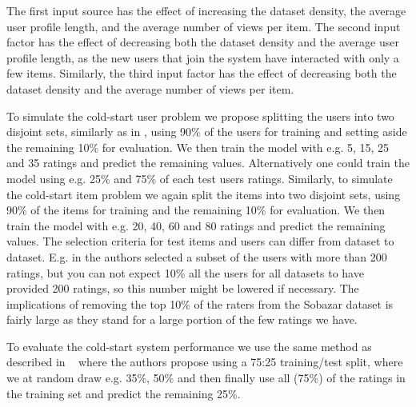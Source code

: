 The first input source has the effect of increasing the dataset density, the average user
profile length, and the average number of views per item. The second input factor has
the effect of decreasing both the dataset density and the average user profile length,
as the new users that join the system have interacted with only a few items. Similarly, the third input
factor has the effect of decreasing both the dataset density and the average number of
views per item.

To simulate the cold-start user problem we propose splitting the users into two disjoint
sets, similarly as in \cite{Stern2009, Lam2008}, using 90\% of the users for training and
setting aside the remaining 10\% for evaluation. We then train the model with e.g. 5, 15,
25 and 35 ratings and predict the remaining values. Alternatively one could train the model
using e.g. 25\% and 75\% of each test users ratings. Similarly, to simulate the cold-start
item problem we again split the items into two disjoint sets, using 90\% of the items
for training and the remaining 10\% for evaluation.  We then train the model with
e.g. 20, 40, 60 and 80 ratings and predict the remaining values. The selection criteria
for test items and users can differ from dataset to dataset. E.g. in \cite{Rashid2002, Rashid2008}
the authors selected a subset of the users with more than 200 ratings, but you can not
expect 10\% all the users for all datasets to have provided 200 ratings, so this number
might be lowered if necessary. The implications of removing the top 10\% of the
raters from the Sobazar dataset is fairly large as they stand for a large portion
of the few ratings we have.

To evaluate the cold-start system performance we use the same method as described
in ~\cite{Agarwal2009} where the authors propose using a 75:25 training/test split,
where we at random draw e.g. 35\%, 50\% and then finally use all (75\%) of the
ratings in the training set and predict the remaining 25\%.



